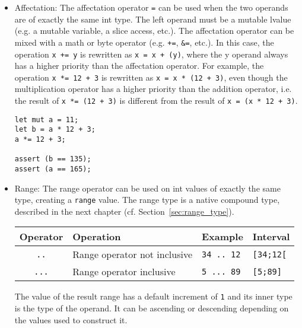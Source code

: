 \begin{itemize}
\item Affectation: The affectation operator \texttt{=} can be used when the two
  operands are of exactly the same int type. The left operand must be a mutable
  lvalue (e.g. a mutable variable, a slice access, etc.). The affectation
  operator can be mixed with a math or byte operator (e.g. \texttt{+=},
  \texttt{\&=}, etc.). In this case, the operation \texttt{x += y} is rewritten
  as \texttt{x = x + (y)}, where the y operand always has a higher priority than
  the affectation operator. For example, the operation \texttt{x *= 12 + 3} is
  rewritten as \texttt{x = x * (12 + 3)}, even though the multiplication
  operator has a higher priority than the addition operator, i.e. the result of
  \texttt{x *= (12 + 3)} is different from the result of \texttt{x = (x * 12 +
    3)}.

  \begin{lstlisting}[style=coloredverbatim]
let mut a = 11;
let b = a * 12 + 3;
a *= 12 + 3;

assert (b == 135);
assert (a == 165);
  \end{lstlisting}

\item Range: The range operator can be used on int values of exactly the same
  type, creating a \texttt{range} value. The range type is a native compound
  type, described in the next chapter (cf. Section~\ref{sec:range_type}).

  \begin{center}
    \vspace{-10pt}
    \begin{adjustbox}{max width=1.0\linewidth}
      \begin{tabular}{|c|lll|}
        \hline
        Operator & Operation & Example & Interval\\[0pt]
        \hline
        \texttt{..} & Range operator not inclusive & \texttt{34 .. 12} & \texttt{[34;12[}\\[0pt]
            \texttt{...} & Range operator inclusive & \texttt{5 ... 89} & \texttt{[5;89]}\\[0pt]
            \hline
      \end{tabular}
    \end{adjustbox}
  \end{center}

The value of the result range has a default increment of \texttt{1} and its
inner type is the type of the operand. It can be ascending or descending
depending on the values used to construct it.

\end{itemize}

